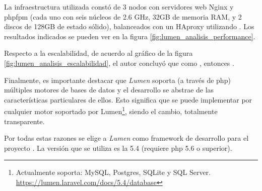 La infraestructura utilizada constó de 3 nodos con servidores web Nginx y \gls{phpfpm} (cada uno con seis núcleos de 2.6 GHz, 32GB de memoria RAM, y 2 discos de 128GB de estado sólido), balanceados con un HAproxy utilizando . Los resultados indicados se pueden ver en la figura \ref{fig:lumen_analisis_performance}.


Respecto a la escalabilidad, de acuerdo al gráfico de la figura \ref{fig:lumen_analisis_escalabilidad}, el autor concluyó que como , entonces  \cite{biler2015performance}.


Finalmente, es importante destacar que \textit{Lumen} soporta (a través de \gls{php}) múltiples motores de bases de datos y el desarrollo se abstrae de las características particulares de ellos. Esto significa que se puede implementar por cualquier motor soportado por Lumen\footnote{Actualmente soporta: MySQL, Postgres, SQLite y SQL Server. \url{https://lumen.laravel.com/docs/5.4/database}}, siendo el cambio, totalmente transparente.

Por todas estas razones se elige a \textit{Lumen} como \gls{framework} de desarrollo para el proyecto \nombreApp. La versión que se utiliza es la 5.4 (requiere \gls{php} 5.6 o superior).


